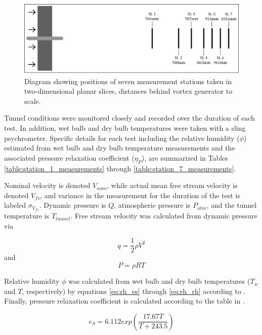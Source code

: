 \begin{figure}[H]
	\centering
	\includegraphics[width=6in]{figs/setup/station_diagram}
	\caption{Diagram showing positions of seven measurement stations taken in 
		two-dimensional planar slices, distances behind vortex generator to 
		scale.}
	\label{fig:station_diagram}
\end{figure}

Tunnel conditions were monitored closely and recorded over the duration of each 
test. In addition, wet bulb and dry bulb temperatures were taken with a sling 
psychrometer. Specific details for each test including the relative humidity 
($\phi$) estimated from wet bulb and dry bulb temperature measurements and the
associated pressure relaxation coefficient 
($\eta_P$), are summarized in Tables \ref{table:station_1_measurements} through 
\ref{table:station_7_measurements}. 

Nominal velocity is denoted $V_{nom}$, while actual mean free stream 
velocity is denoted $V_{fs}$, and variance in the measurement for the 
duration of the test is labeled $\sigma_{V_{fs}}$. Dynamic pressure is $Q$, 
atmospheric 
pressure is $P_{atm}$, and the tunnel temperature is $T_{tunnel}$. Free stream 
velocity was calculated from dynamic pressure via

\begin{equation}
q = \frac{1}{2}\rho V^2
\end{equation}
\noindent
and
\begin{equation}
P = \rho R T
\end{equation}

Relative 
humidity $\phi$ was calculated from wet bulb and dry bulb temperatures ($T_w$ 
and $T$, respectively) by 
equations \ref{eq:rh_es} through \ref{eq:rh_rh} according to \cite{owen1977}. 
Finally, pressure relaxation coefficient is calculated according to the table 
in \cite{ash2011}.

\begin{equation}
e_S = 6.112 exp \left( \frac{17.67 T}{T + 243.5} \right)
\label{eq:rh_es}
\end{equation}


